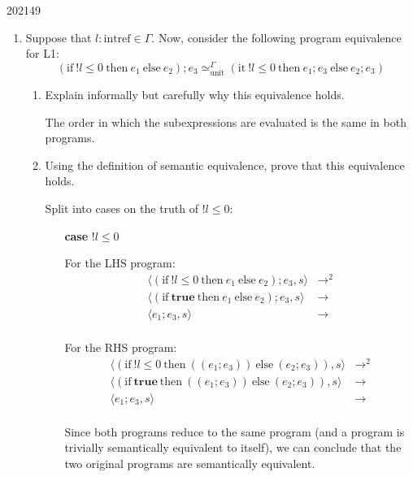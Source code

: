 \documentclass[10pt,\jkfside,a4paper]{article}
\begin{document}
\begin{examquestion}{2021}{4}{9}

\begin{enumerate}

\item Suppose that $l : \text{intref} \in \Gamma$. Now, consider the
following program equivalence for L1:
\[
(\text{if} \ !l \leq 0 \ \text{then} \ e_1 \ \text{else} \ e_2); e_3
\simeq^{\Gamma}_{\text{unit}} (\text{it} \ !l \leq 0 \ \text{then} \ e_1;
e_3 \ \text{else} \ e_2; e_3)
\]

\begin{enumerate}

\item Explain informally but carefully why this equivalence holds.

The order in which the subexpressions are evaluated is the same in both
programs.

\item Using the definition of semantic equivalence, prove that this
equivalence holds.

Split into cases on the truth of $!l \leq 0$:

\begin{itemize}

\item[\textbf{case}] $!l \leq 0$

For the LHS program:
\[
\begin{split}
\langle (\text{if} \ !l \leq 0 \ \text{then} \ e_1 \ \text{else} \ e_2);
e_3, s \rangle &\longrightarrow^2 \\
\langle (\text{if} \ \mathbf{true} \ \text{then} \ e_1 \ \text{else} \ e_2);
e_3, s \rangle &\longrightarrow \\
\langle e_1; e_3, s \rangle &\longrightarrow \\
\end{split}
\]

For the RHS program:
\[
\begin{split}
\langle (\text{if} \ !l \leq 0 \ \text{then} \ ((e_1; e_3)) \ \text{else} \
(e_2; e_3)), s \rangle &\longrightarrow^2\\
\langle (\text{if} \ \mathbf{true} \ \text{then} \ ((e_1; e_3)) \ \text{else} \
(e_2; e_3)), s \rangle &\longrightarrow \\
\langle e_1; e_3, s \rangle &\longrightarrow \\
\end{split}
\]

Since both programs reduce to the same program (and a program is trivially
semantically equivalent to itself), we can conclude that the two original
programs are semantically equivalent.


\end{itemize}
\end{enumerate}
\end{enumerate}
\end{examquestion}
\end{document}
